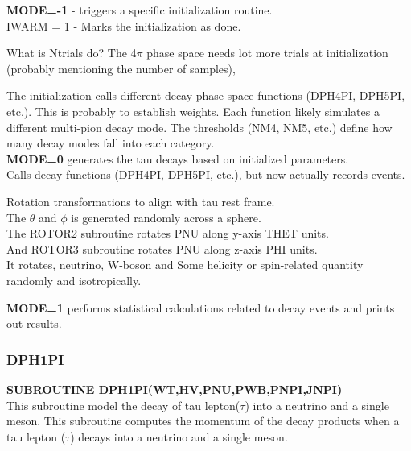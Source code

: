 \documentclass[12pt]{article}
\begin{document}
\textbf{MODE=-1}  - triggers a specific initialization routine.\\
IWARM = 1 -  Marks the initialization as done.


What is Ntrials do? The 4$\pi$ phase space needs lot more trials at initialization (probably mentioning the number of samples),

The initialization calls different decay phase space functions (DPH4PI, DPH5PI, etc.). This is probably to establish weights. Each function likely simulates a different multi-pion decay mode. The thresholds (NM4, NM5, etc.) define how many decay modes fall into each category.\\

\vspace{0.5cm}
\textbf{MODE=0} generates the tau decays based on initialized parameters.\\
Calls decay functions (DPH4PI, DPH5PI, etc.), but now actually records events.

Rotation transformations to align with tau rest frame.\\

The $\theta$ and $\phi$ is generated randomly across a sphere. \\

The ROTOR2 subroutine rotates PNU along y-axis THET units.\\
And ROTOR3 subroutine rotates PNU along z-axis PHI units.\\

It rotates, neutrino, W-boson and Some helicity or spin-related quantity randomly and isotropically.

\vspace{0.5cm}
\textbf{MODE=1} performs statistical calculations related to decay events and prints out results.



\subsubsection{DPH1PI}
\textbf{SUBROUTINE DPH1PI(WT,HV,PNU,PWB,PNPI,JNPI)}\\

This subroutine model the decay of tau lepton($\tau$) into a neutrino and a single meson. This subroutine computes the momentum of the decay products when a tau lepton ($\tau$) decays into a neutrino and a single meson.
\end{document}
